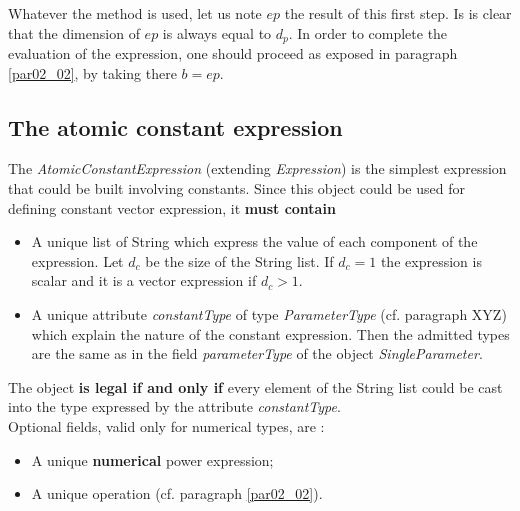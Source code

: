 \documentclass[a4paper,11pt] {article}
\begin{document}
Whatever the method is used, let us note $ep$ the result of this first step. Is is clear that the dimension of $ep$ 
is always equal to $d_p$. In order to complete the evaluation of the expression, one should proceed as exposed in paragraph \ref{par02_02}, by taking there $b=ep$.

\subsection{The atomic constant expression}\label{par02_03}
The {\it AtomicConstantExpression} (extending {\it Expression}) is the simplest expression that could be built involving constants. Since this object could be used for defining constant vector expression, it {\bf must contain} 
\begin{itemize}
\item A unique list of String which express the value of each component of the expression. Let $d_c$ be the size of the String list. If $d_c=1$ the expression is scalar and it is a vector expression if $d_c>1$. 
\item A unique attribute {\it constantType} of type {\it ParameterType} (cf. paragraph XYZ) which explain the nature of the constant expression. Then the admitted types are the same as in the field {\it parameterType} of the object {\it SingleParameter}. 
\end{itemize}
The object {\bf is legal if and only if} every element of the String list could be cast into the type expressed by the attribute {\it constantType}.\\

Optional fields, valid only for numerical types, are : 
\begin{itemize}
\item A unique {\bf numerical} power expression;
\item A unique operation (cf. paragraph \ref{par02_02}).
\end{itemize}
\end{document}
